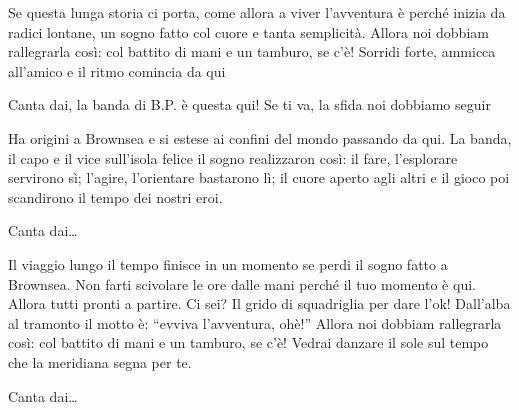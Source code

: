 
\beginverse

Se questa lunga storia
ci porta, come allora a viver l'avventura è perché
inizia da radici lontane, un sogno fatto col cuore
e tanta semplicità.
Allora noi dobbiam rallegrarla così:
col battito di mani e un tamburo, se c'è!
Sorridi forte, ammicca all'amico e
il ritmo comincia da qui

\endverse

\beginchorus

Canta dai, la banda di B.P. è questa qui!
Se ti va, la sfida noi dobbiamo seguir

\endchorus

\chordsoff

\beginverse

Ha origini a Brownsea
e si estese ai confini del mondo passando da qui.
La banda, il capo e il vice sull'isola felice
il sogno realizzaron così:
il fare, l'esplorare servirono sì;
l'agire, l'orientare bastarono lì;
il cuore aperto agli altri e il gioco poi
scandirono il tempo dei nostri eroi.

\endverse

\beginchorus

Canta dai\dots

\endchorus

\beginverse

Il viaggio lungo il tempo finisce in un momento
se perdi il sogno fatto a Brownsea.
Non farti scivolare le ore dalle mani
perché il tuo momento è qui.
Allora tutti pronti a partire. Ci sei?
Il grido di squadriglia per dare l'ok!
Dall'alba al tramonto il motto è:
“evviva l'avventura, ohè!”
Allora noi dobbiam rallegrarla così:
col battito di mani e un tamburo, se c'è!
Vedrai danzare il sole sul tempo che
la meridiana segna per te.

\endverse

\beginchorus

Canta dai\dots

\endchorus

\endsong